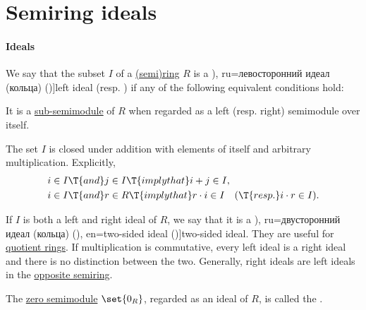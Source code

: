 \section{Semiring ideals}\label{sec:semiring_ideals}

\paragraph{Ideals}

\begin{definition}\label{def:semiring_ideal}
  We say that the subset \( I \) of a \hyperref[def:semiring]{(semi)ring} \( R \) is a \term[bg=ляв идеал (в пръстен) (\cite[def. V.6]{ГеновМиховскиМоллов1991Алгебра}), ru=левосторонний идеал (кольца) (\cite[387]{Винберг2014КурсАлгебры})]{left ideal} (resp. ) if any of the following equivalent conditions hold:
  \begin{thmenum}[series=def:semiring_ideal]
    \mimprovised It is a \hyperref[def:semimodule/subobject]{sub-semimodule} of \( R \) when regarded as a left (resp. right) semimodule over itself.

    \medskip

     The set \( I \) is closed under addition with elements of itself and arbitrary multiplication. Explicitly,
    \begin{align}
      &i \in I \T{and} j \in I \T{imply that} i + j \in I, \label{eq:def:semiring_ideal/direct/additive} \\
      &i \in I \T{and} r \in R \T{imply that} r \cdot i \in I \quad (\T{resp.} i \cdot r \in I). \label{eq:def:semiring_ideal/direct/multiplicative}
    \end{align}
  \end{thmenum}

  If \( I \) is both a left and right ideal of \( R \), we say that it is a \term[bg=двустранен идеал (в пръстен) (\cite[def. V.6]{ГеновМиховскиМоллов1991Алгебра}), ru=двусторонний идеал (кольца) (\cite[387]{Винберг2014КурсАлгебры}), en=two-sided ideal (\cite[65]{Golan1999Semirings})]{two-sided ideal}. They are useful for \hyperref[def:ring/quotient]{quotient rings}. If multiplication is commutative, every left ideal is a right ideal and there is no distinction between the two. Generally, right ideals are left ideals in the \hyperref[def:semiring/opposite]{opposite semiring}.

  \begin{thmenum}[resume=def:semiring_ideal]
     The \hyperref[def:semimodule/trivial]{zero semimodule} \( \set{ 0_R } \), regarded as an ideal of \( R \), is called the .


\end{thmenum}
\end{definition}
